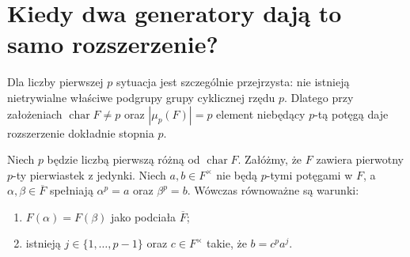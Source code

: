 \section{Kiedy dwa generatory dają to samo rozszerzenie?}
Dla liczby pierwszej $p$ sytuacja jest szczególnie przejrzysta:
nie istnieją nietrywialne właściwe podgrupy grupy cyklicznej
rzędu $p$. Dlatego przy założeniach $\operatorname{char}F\neq p$
oraz $|\mu_p(F)|=p$ element niebędący $p$-tą potęgą
daje rozszerzenie dokładnie stopnia $p$.

\begin{twierdzenie}\label{aa:tw:kummer-prime-classification}
Niech $p$ będzie liczbą pierwszą różną od
$\operatorname{char}F$. Załóżmy, że $F$ zawiera pierwotny
$p$-ty pierwiastek z jedynki. Niech $a,b\in F^\times$
nie będą $p$-tymi potęgami w $F$, a
$\alpha,\beta\in\overline F$ spełniają
$\alpha^p=a$ oraz $\beta^p=b$.
Wówczas równoważne są warunki:
\begin{enumerate}[label=\textup{(\roman*)}]
\item $F(\alpha)=F(\beta)$ jako podciała $\overline F$;
\item istnieją $j\in\{1,\ldots,p-1\}$ oraz
$c\in F^\times$ takie, że $b=c^p a^j$.
\end{enumerate}
\end{twierdzenie}
